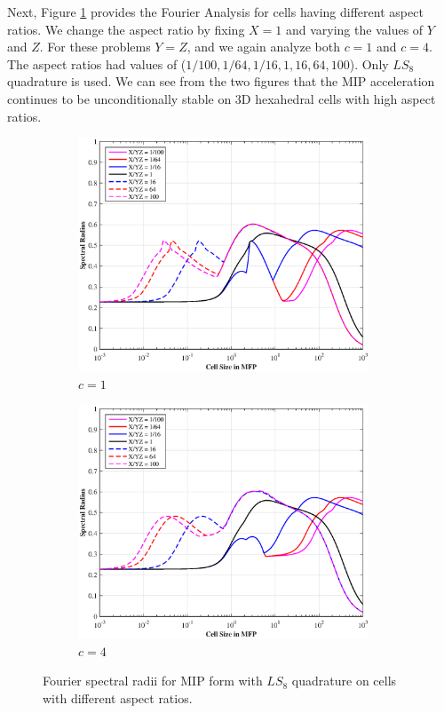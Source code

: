 Next, Figure \ref{fig::DSA_3D1G_Fourier_AR} provides the Fourier Analysis for cells having different aspect ratios. We change the aspect ratio by fixing $X=1$ and varying the values of $Y$ and $Z$. For these problems $Y=Z$, and we again analyze both $c=1$ and $c=4$. The aspect ratios had values of ($1/100,1/64,1/16,1,16,64,100$). Only $LS_8$ quadrature is used. We can see from the two figures that the MIP acceleration continues to be unconditionally stable on 3D hexahedral cells with high aspect ratios. 

\begin{figure}
\centering
	\begin{subfigure}[b]{0.80\textwidth}
		\centering
		\includegraphics[width=0.95\textwidth]{figures/sec_DSA/SI_MIP_hex_AR1.eps}
		\caption{$c=1$}
	\end{subfigure}
	\vfill
	\begin{subfigure}[b]{0.80\textwidth}
		\centering
		\includegraphics[width=0.95\textwidth]{figures/sec_DSA/SI_MIP_hex_AR4.eps}
		\caption{$c=4$}
	\end{subfigure}
\caption{Fourier spectral radii for MIP form with $LS_8$ quadrature on cells with different aspect ratios.}
\label{fig::DSA_3D1G_Fourier_AR}
\end{figure}

